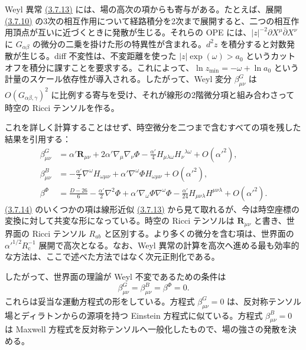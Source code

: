 Weyl 異常 \hyperref[eq:3.7.13a]{(3.7.13)} には、場の高次の項からも寄与がある。たとえば、展開 \hyperref[eq:3.7.10]{(3.7.10)} の3次の相互作用について経路積分を2次まで展開すると、二つの相互作用頂点が互いに近づくときに発散が生じる。それらの OPE には、$|z|^{-2}\partial X^\mu\bar\partial X^\nu$ に $G_{\alpha\beta}$ の微分の二乗を掛けた形の特異性が含まれる。$d^2z$ を積分すると対数発散が生じる。diff 不変性は、不変距離を使った $|z|\exp(\omega)>a_0$ というカットオフを積分に課すことを要求する。これによって、$\ln z_{\min}=-\omega+\ln a_0$ という計量のスケール依存性が導入される。したがって、Weyl 変分 $\beta^G_{\mu\nu}$ は $O(G_{\alpha\beta,\gamma})^2$ に比例する寄与を受け、それが線形の2階微分項と組み合わさって時空の Ricci テンソルを作る。

これを詳しく計算することはせず、時空微分を二つまで含むすべての項を残した結果を引用する：
\begin{align}
\beta^G_{\mu\nu}
&=\alpha'\bm R_{\mu\nu}
+2\alpha'\nabla_\mu\nabla_\nu\Phi
-\frac{\alpha'}4H_{\mu\lambda\omega}H_\nu{}^{\lambda\omega}
+O(\alpha'^2),
\tag{3.7.14a}\label{eq:3.7.14a}\\
\beta^B_{\mu\nu}
&=-\frac{\alpha'}2\nabla^\omega H_{\omega\mu\nu}
+\alpha'\nabla^\omega\Phi H_{\omega\mu\nu}
+O(\alpha'^2),
\tag{3.7.14b}\label{eq:3.7.14b}\\
\beta^\Phi
&=\frac{D-26}{6}-\frac{\alpha'}2\nabla^2\Phi
+\alpha'\nabla_\omega\Phi\nabla^\omega\Phi
-\frac{\alpha'}{24}H_{\mu\nu\lambda}H^{\mu\nu\lambda}
+O(\alpha'^2).
\tag{3.7.14c}\label{eq:3.7.14c}
\end{align}
\hyperref[eq:3.7.14a]{(3.7.14)} のいくつかの項は線形近似 \hyperref[eq:3.7.13a]{(3.7.13)} から見て取れるが、今は時空座標の変換に対して共変な形になっている。時空の Ricci テンソルは $\bm R_{\mu\nu}$ と書き、世界面の Ricci テンソル $R_{ab}$ と区別する。より多くの微分を含む項は、世界面の $\alpha'^{1/2}R_{\mathrm c}^{-1}$ 展開で高次となる。なお、Weyl 異常の計算を高次へ進める最も効率的な方法は、ここで述べた方法ではなく次元正則化である。

したがって、世界面の理論が Weyl 不変であるための条件は
\begin{equation}
\beta^G_{\mu\nu}=\beta^B_{\mu\nu}=\beta^\Phi=0.
\tag{3.7.15}\label{eq:3.7.15}
\end{equation}
これらは妥当な運動方程式の形をしている。方程式 $\beta^G_{\mu\nu}=0$ は、反対称テンソル場とディラトンからの源項を持つ Einstein 方程式に似ている。方程式 $\beta^B_{\mu\nu}=0$ は Maxwell 方程式を反対称テンソルへ一般化したもので、場の強さの発散を決める。

